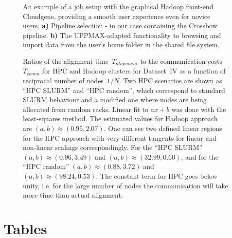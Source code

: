 \documentclass[10pt]{article}
\begin{document}
\begin{figure}[!ht]
\begin{subfigure}[b]{0.6\textwidth}
		\subcaption{}
	\end{subfigure}
	\caption{An example of a job setup with the graphical Hadoop front-end Cloudgene, providing a smooth user experience even for novice users. \textbf{a)} Pipeline selection - in our case containing the Crossbow pipeline. \textbf{b)} The UPPMAX-adapted functionality to browsing and import data from the user's home folder in the shared file system.}
	\label{fig:fig4}
\end{figure}


\begin{figure}[!ht]
	\small
	
	\normalsize
	\caption{Ratios of the alignment time~$T_{alignment}$ to the communication costs~$T_{comm}$ for HPC and Hadoop clusters for Dataset~IV as a function of reciprocal number of nodes~$1/N$. Two HPC scenarios are shown as ``HPC SLURM'' and ``HPC random'', which correspond to standard SLURM behaviour and a modified one where nodes are being allocated from random racks.
Linear fit  to $ax+b$ was done with the least-squares method.
The estimated values for Hadoop approach are $(a,b)\approx(0.95,2.07)$.
One  can see two defined linear regions for the HPC approach with very different tangents for linear and non-linear scalings correspondingly.
For  the ``HPC SLURM'' $(a,b)\approx (0.96, 3.49)$ and $(a,b)\approx (32.99, 0.60)$, and for  the ``HPC random'' $(a,b)\approx (0.88, 3.72)$ and $(a,b)\approx (98.24, 0.53)$.
 The constant term for HPC goes below unity, i.e. for the large number of nodes the communication will take more time than actual alignment. 
}
	\label{fig:fig3}
\end{figure}







\section*{Tables}
\end{document}
